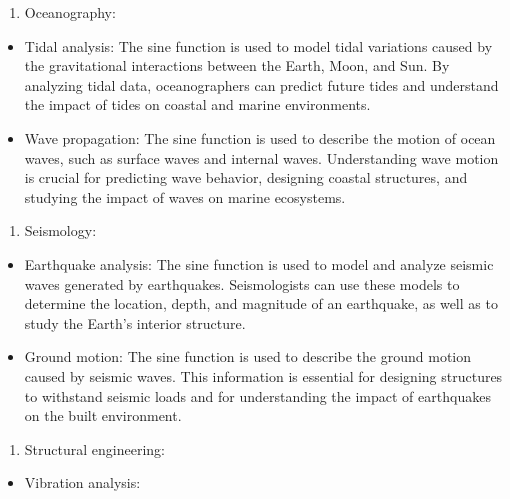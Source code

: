 \documentclass[
]{article}
\providecommand{\tightlist}{%
  \setlength{\itemsep}{0pt}\setlength{\parskip}{0pt}}
\begin{document}
\begin{enumerate}
\def\labelenumi{\arabic{enumi}.}
\setcounter{enumi}{5}
\tightlist
\item
  Oceanography:
\end{enumerate}

\begin{itemize}
\item
  Tidal analysis: The sine function is used to model tidal variations
  caused by the gravitational interactions between the Earth, Moon, and
  Sun. By analyzing tidal data, oceanographers can predict future tides
  and understand the impact of tides on coastal and marine environments.
\item
  Wave propagation: The sine function is used to describe the motion of
  ocean waves, such as surface waves and internal waves. Understanding
  wave motion is crucial for predicting wave behavior, designing coastal
  structures, and studying the impact of waves on marine ecosystems.
\end{itemize}

\begin{enumerate}
\def\labelenumi{\arabic{enumi}.}
\setcounter{enumi}{6}
\tightlist
\item
  Seismology:
\end{enumerate}

\begin{itemize}
\item
  Earthquake analysis: The sine function is used to model and analyze
  seismic waves generated by earthquakes. Seismologists can use these
  models to determine the location, depth, and magnitude of an
  earthquake, as well as to study the Earth's interior structure.
\item
  Ground motion: The sine function is used to describe the ground motion
  caused by seismic waves. This information is essential for designing
  structures to withstand seismic loads and for understanding the impact
  of earthquakes on the built environment.
\end{itemize}

\begin{enumerate}
\def\labelenumi{\arabic{enumi}.}
\setcounter{enumi}{7}
\tightlist
\item
  Structural engineering:
\end{enumerate}

\begin{itemize}
\tightlist
\item
  Vibration analysis:
\end{itemize}
\end{document}
